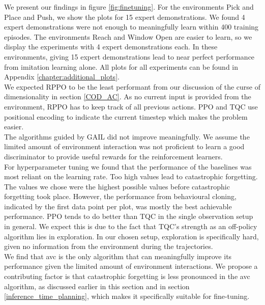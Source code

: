 We present our findings in figure \ref{fig:finetuning}. 
For the environments Pick and Place and Push, we show the plots for 15 expert demonstrations. We found 4 expert demonstrations were not 
enough to meaningfully learn within 400 training episodes. The environments Reach and Window Open are easier to learn, so we display the 
experiments with 4 expert demonstrations each. In these environments, giving 15 expert demonstrations lead to near perfect performance from imitation learning alone. 
All plots for all experiments can be found in Appendix \ref{chapter:additional_plots}.\\

We expected RPPO to be the least performant from our discussion of the curse of dimensionality in section \ref{COD_AC}. As no current input 
is provided from the environment, RPPO has to keep track of all previous actions. PPO and TQC use positional encoding to indicate the current 
timestep which makes the problem easier.\\ 

The algorithms guided by GAIL did not improve meaningfully. We assume the limited amount of environment 
interaction was not proficient to learn a good discriminator to provide useful rewards for the reinforcement learners.\\ 

For hyperparameter tuning we found that the performance of the baselines was most 
reliant on the learning rate. Too high values lead to catastrophic forgetting. The values we chose were the highest possible values before 
catastrophic forgetting took place. However, the performance from behavioural cloning, indicated by the first data point per plot, was mostly 
the best achievable performance. PPO tends to do better than TQC in the single observation setup in general. We expect this is due to the 
fact that TQC's strength as an off-policy algorithm lies in exploration. In our chosen setup, exploration is specifically hard, given no 
information from the environment during the trajectories.\\

We find that \ac{avc} is the only algorithm that can meaningfully improve its performance given the limited amount of environment interactions. 
We propose a contributing factor is that catastrophic forgetting is less pronounced in the \ac{avc} algorithm, as discussed earlier in this section and in section \ref{inference_time_planning}, 
which makes it specifically suitable for fine-tuning.



